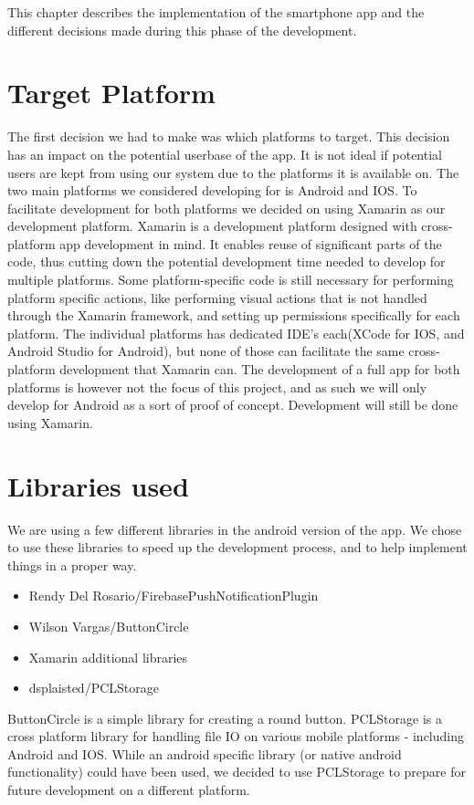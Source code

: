 This chapter describes the implementation of the smartphone app and the different decisions made during this phase of the development. 

\section{Target Platform}
The first decision we had to make was which platforms to target. This decision has an impact on the potential userbase of the app. It is not ideal if potential users are kept from using our system due to the platforms it is available on.
The two main platforms we considered developing for is Android and IOS. To facilitate development for both platforms we decided on using Xamarin \cite{xamarin} as our development platform. 
Xamarin is a development platform designed with cross-platform app development in mind. 
It enables reuse of significant parts of the code, thus cutting down the potential development time needed to develop for multiple platforms. Some platform-specific code is still necessary for performing platform specific actions, like performing visual actions that is not handled through the Xamarin framework, and setting up permissions specifically for each platform.
The individual platforms has dedicated IDE’s each(XCode\cite{xcode} for IOS, and Android Studio for Android), but none of those can facilitate the same cross-platform development that Xamarin can. 
The development of a full app for both platforms is however not the focus of this project, and as such we will only develop for Android as a sort of proof of concept. Development will still be done using Xamarin. 

\section{Libraries used}
We are using a few different libraries in the android version of the app. We chose to use these libraries to speed up the development process, and to help implement things in a proper way.
\begin{itemize}
    \item Rendy Del Rosario/FirebasePushNotificationPlugin
    \item Wilson Vargas/ButtonCircle
    \item Xamarin additional libraries
    \item dsplaisted/PCLStorage
\end{itemize}

ButtonCircle is a simple library for creating a round button.
PCLStorage is a cross platform library for handling file IO on various mobile platforms - including Android and IOS. While an android specific library (or native android functionality) could have been used, we decided to use PCLStorage to prepare for future development on a different platform.

